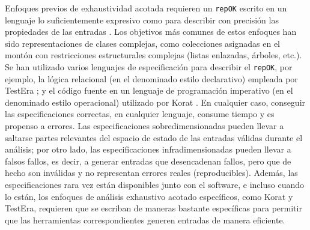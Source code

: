 Enfoques previos de exhaustividad acotada requieren un \texttt{repOK} escrito en un lenguaje lo suficientemente expresivo como para describir con precisión las propiedades de las entradas \cite{Marinov01, Boyapati02}. Los objetivos más comunes de estos enfoques han sido representaciones de clases complejas, como colecciones asignadas en el montón con restricciones estructurales complejas (listas enlazadas, árboles, etc.). Se han utilizado varios lenguajes de especificación para describir el \texttt{repOK}, por ejemplo, la lógica relacional (en el denominado estilo declarativo) empleada por \textsf{TestEra} \cite{Marinov01}; y el código fuente en un lenguaje de programación imperativo (en el denominado estilo operacional) utilizado por \textsf{Korat} \cite{Boyapati02}. En cualquier caso, conseguir las especificaciones correctas, en cualquier lenguaje, consume tiempo y es propenso a errores. Las especificaciones sobredimensionadas pueden llevar a saltarse partes relevantes del espacio de estado de las entradas válidas durante el análisis; por otro lado, las especificaciones infradimensionadas pueden llevar a falsos fallos, es decir, a generar entradas que desencadenan fallos, pero que de hecho son inválidas y no representan errores reales (reproducibles). Además, las especificaciones rara vez están disponibles junto con el software, e incluso cuando lo están, los enfoques de análisis exhaustivo acotado específicos, como \textsf{Korat} y \textsf{TestEra}, requieren que se escriban de maneras bastante específicas para permitir que las herramientas correspondientes generen entradas de manera eficiente.
